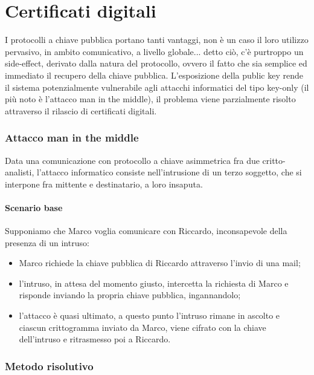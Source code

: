 \chapter{Certificati digitali}

I protocolli a chiave pubblica portano tanti vantaggi, non è un caso il loro utilizzo pervasivo, in ambito comunicativo, a livello globale... detto ciò, c'è purtroppo un side-effect, derivato dalla natura del protocollo, ovvero il fatto che sia semplice ed immediato il recupero della chiave pubblica. L'esposizione della public key rende il sistema potenzialmente vulnerabile agli attacchi informatici del tipo key-only (il più noto è l'attacco man in the middle), il problema viene parzialmente risolto attraverso il rilascio di certificati digitali.

\subsection{Attacco man in the middle}

Data una comunicazione con protocollo a chiave asimmetrica fra due critto-analisti, l'attacco informatico consiste nell'intrusione di un terzo soggetto, che si interpone fra mittente e destinatario, a loro insaputa. 

\subsubsection{Scenario base}

Supponiamo che Marco voglia comunicare con Riccardo, inconsapevole della presenza di un intruso:

\begin{itemize}
	\item Marco richiede la chiave pubblica di Riccardo attraverso l'invio di una mail;
	\item l'intruso, in attesa del momento giusto, intercetta la richiesta di Marco e risponde inviando la propria chiave pubblica, ingannandolo;
	\item l'attacco è quasi ultimato, a questo punto l'intruso rimane in ascolto e ciascun crittogramma inviato da Marco, viene cifrato con la chiave dell'intruso e ritrasmesso poi a Riccardo.
\end{itemize}

\subsection{Metodo risolutivo}

